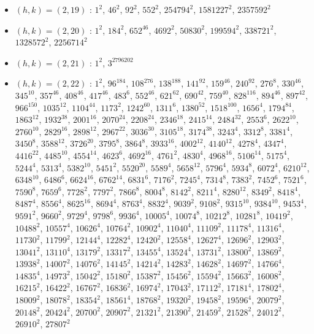 \begin{itemize}
\item $(h,k)=(2,19)$ : $1^{2}$, $46^{2}$, $92^{2}$, $552^{2}$, $254794^{2}$, $1581227^{2}$, $2357592^{2}$
\item $(h,k)=(2,20)$ : $1^{2}$, $184^{2}$, $652^{46}$, $4692^{2}$, $50830^{2}$, $199594^{2}$, $338721^{2}$, $1328572^{2}$, $2256714^{2}$
\item $(h,k)=(2,21)$ : $1^{2}$, $3^{2796202}$
\item $(h,k)=(2,22)$ : $1^{2}$, $96^{184}$, $108^{276}$, $138^{188}$, $141^{92}$, $159^{46}$, $240^{92}$, $276^{8}$, $330^{46}$, $345^{10}$, $357^{46}$, $408^{46}$, $417^{46}$, $483^{6}$, $552^{46}$, $621^{62}$, $690^{42}$, $759^{40}$, $828^{116}$, $894^{46}$, $897^{42}$, $966^{150}$, $1035^{12}$, $1104^{44}$, $1173^{2}$, $1242^{60}$, $1311^{6}$, $1380^{52}$, $1518^{100}$, $1656^{4}$, $1794^{84}$, $1863^{12}$, $1932^{38}$, $2001^{16}$, $2070^{24}$, $2208^{24}$, $2346^{18}$, $2415^{14}$, $2484^{32}$, $2553^{6}$, $2622^{10}$, $2760^{10}$, $2829^{16}$, $2898^{12}$, $2967^{22}$, $3036^{30}$, $3105^{18}$, $3174^{38}$, $3243^{4}$, $3312^{8}$, $3381^{4}$, $3450^{8}$, $3588^{12}$, $3726^{20}$, $3795^{8}$, $3864^{8}$, $3933^{16}$, $4002^{12}$, $4140^{12}$, $4278^{4}$, $4347^{4}$, $4416^{22}$, $4485^{10}$, $4554^{14}$, $4623^{6}$, $4692^{16}$, $4761^{2}$, $4830^{4}$, $4968^{16}$, $5106^{14}$, $5175^{4}$, $5244^{4}$, $5313^{4}$, $5382^{10}$, $5451^{2}$, $5520^{20}$, $5589^{4}$, $5658^{12}$, $5796^{4}$, $5934^{8}$, $6072^{4}$, $6210^{12}$, $6348^{10}$, $6486^{6}$, $6624^{16}$, $6762^{14}$, $6831^{6}$, $7176^{2}$, $7245^{4}$, $7314^{8}$, $7383^{2}$, $7452^{6}$, $7521^{6}$, $7590^{8}$, $7659^{6}$, $7728^{2}$, $7797^{2}$, $7866^{8}$, $8004^{8}$, $8142^{2}$, $8211^{4}$, $8280^{12}$, $8349^{2}$, $8418^{4}$, $8487^{4}$, $8556^{4}$, $8625^{16}$, $8694^{4}$, $8763^{4}$, $8832^{4}$, $9039^{2}$, $9108^{2}$, $9315^{10}$, $9384^{10}$, $9453^{4}$, $9591^{2}$, $9660^{2}$, $9729^{4}$, $9798^{6}$, $9936^{4}$, $10005^{4}$, $10074^{8}$, $10212^{8}$, $10281^{8}$, $10419^{2}$, $10488^{2}$, $10557^{4}$, $10626^{4}$, $10764^{2}$, $10902^{4}$, $11040^{4}$, $11109^{2}$, $11178^{4}$, $11316^{4}$, $11730^{2}$, $11799^{2}$, $12144^{4}$, $12282^{4}$, $12420^{2}$, $12558^{4}$, $12627^{4}$, $12696^{2}$, $12903^{2}$, $13041^{2}$, $13110^{4}$, $13179^{2}$, $13317^{2}$, $13455^{4}$, $13524^{4}$, $13731^{2}$, $13800^{2}$, $13869^{2}$, $13938^{2}$, $14007^{2}$, $14076^{2}$, $14145^{2}$, $14214^{2}$, $14283^{2}$, $14628^{2}$, $14697^{2}$, $14766^{4}$, $14835^{4}$, $14973^{2}$, $15042^{2}$, $15180^{2}$, $15387^{2}$, $15456^{2}$, $15594^{2}$, $15663^{2}$, $16008^{2}$, $16215^{2}$, $16422^{2}$, $16767^{2}$, $16836^{2}$, $16974^{2}$, $17043^{2}$, $17112^{2}$, $17181^{4}$, $17802^{4}$, $18009^{2}$, $18078^{2}$, $18354^{2}$, $18561^{4}$, $18768^{2}$, $19320^{2}$, $19458^{2}$, $19596^{4}$, $20079^{2}$, $20148^{2}$, $20424^{2}$, $20700^{2}$, $20907^{2}$, $21321^{2}$, $21390^{2}$, $21459^{2}$, $21528^{2}$, $24012^{2}$, $26910^{2}$, $27807^{2}$

\end{itemize}
